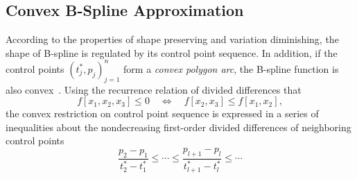 \documentclass{sig-alternate}
\begin{document}
\subsection{Convex B-Spline Approximation}
According to the properties of shape preserving and variation
diminishing, the shape of B-spline is regulated by its control point
sequence. In addition, if the control points 
$(t_{j}^*,p_j)_{j=1}^n$ form a \emph{convex polygon arc}, the
B-spline function is also convex~\cite{Farin88,PGS}. Using the
recurrence relation of divided differences that 
\[f[x_1,x_2,x_3]\leq 0\quad\Leftrightarrow
\quad f[x_2,x_3]\leq f[x_1,x_2],\] 
the convex restriction on control point sequence
is expressed in a series of inequalities about the
nondecreasing first-order divided differences of neighboring control
points 
\begin{equation}\label{eqn:ineq_div_diff}
\frac{p_{2}-p_{1}}{t_{2}^*-t_{1}^*} \leq \cdots \leq
\frac{p_{l+1}-p_{l}}{t_{l+1}^*-t_{l}^*} \leq \cdots
\end{equation}
\end{document}
